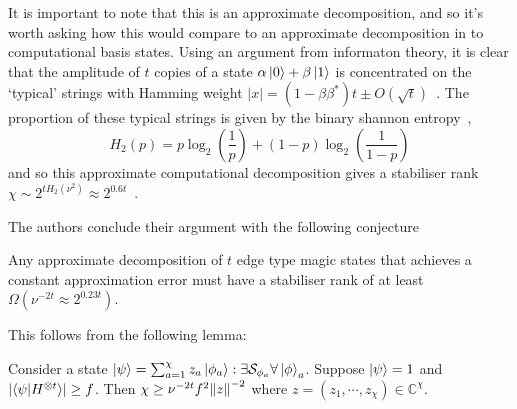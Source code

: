 \documentclass{standalone}
\begin{document}
\par
It is important to note that this is an approximate decomposition, and so it's worth asking how this would compare to an approximate decomposition in to computational basis states. Using an argument from informaton theory, it is clear that the amplitude of $t$ copies of a state $\alpha\ket{0}+\beta\ket{1}$ is concentrated on the `typical' strings with Hamming weight $\vert x \vert = (1-\beta\beta^{*})t\pm O(\sqrt{t})$~\cite{Bravyi2016b,Preskill2016}. The proportion of these typical strings is given by the binary shannon entropy~\cite{Preskill2016}, 
\[H_{2}(p)= p\log_{2}\left(\frac{1}{p}\right) + (1-p)\log_{2}\left(\frac{1}{1-p}\right)\] 
and so this approximate computational decomposition gives a stabiliser rank $\chi\sim 2^{tH_{2}(\nu^{2})} \approx 2^{0.6t}$~\cite{Bravyi2015}.
\par
The authors conclude their argument with the following conjecture
\begin{conj}\label{thm:minscaling}
Any approximate decomposition of $t$ edge type magic states that achieves a constant approximation error must have a stabiliser rank of at least $\Omega\left(\nu^{-2t}\approx2^{0.23t}\right)$.
\end{conj}
This follows from the following lemma:
\begin{lem}\label{thm:scalinglemma}
Consider a state $\ket{\psi}=\sum_{a=1}^{\chi}z_{a}\ket{\phi_{a}}:\exists \mathcal{S}_{\phi_{a}}\forall\ket{\phi}_{a}$. Suppose $\ket{\psi}=1$ and $\left|\braket{\psi}{H^{\otimes t}}\right|\geq f$. Then $\chi\geq\nu^{-2t}f^{2}\norm{z}^{-2}$ where $z=(z_{1},\cdots,z_{\chi})\in\mathbb{C}^{\chi}$.
\end{lem}
\end{document}
